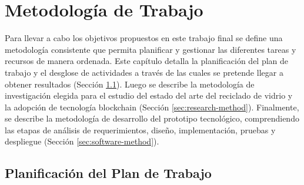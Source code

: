 \chapter[Metodología de Trabajo]{Metodología de Trabajo}
\label{cp:methodology}

\parindent0pt

Para llevar a cabo los objetivos propuestos en este trabajo final se define una metodología consistente que permita planificar y gestionar las diferentes tareas y recursos de manera ordenada. Este capítulo detalla la planificación del plan de trabajo y el desglose de actividades a través de las cuales se pretende llegar a obtener resultados (Sección \ref{sec:thesis-plan}). Luego se describe la metodología de investigación elegida para el estudio del estado del arte del reciclado de vidrio y la adopción de tecnología blockchain (Sección \ref{sec:research-method}). Finalmente, se describe la metodología de desarrollo del prototipo tecnológico, comprendiendo las etapas de análisis de requerimientos, diseño, implementación, pruebas y despliegue (Sección \ref{sec:software-method}).

\section{Planificación del Plan de Trabajo}
\label{sec:thesis-plan}

